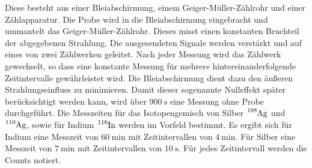 \FloatBarrier
Diese besteht aus einer Bleiabschirmung, einem Geiger-Müller-Zählrohr und einer Zählapparatur.
Die Probe wird in die Bleiabschirmung eingebracht und ummantelt das Geiger-Müller-Zählrohr.
Dieses misst einen konstanten Bruchteil der abgegebenen Strahlung.
Die ausgesendeten Signale werden verstärkt und auf eines von zwei Zählwerken geleitet.
Nach jeder Messung wird das Zählwerk gewechselt, so dass eine konstante Messung für mehrere hintereinanderfolgende Zeitintervalle gewährleistet wird.
Die Bleiabschirmung dient dazu den äußeren Strahlungseinfluss zu minimieren.
Damit dieser sogenannte Nulleffekt später berücksichtigt werden kann, wird über $\SI{900}{\second}$ eine Messung ohne Probe durchgeführt.
Die Messzeiten für das Isotopengemisch von Silber $\ce{^{108}Ag}$ und $\ce{^{110}Ag}$, sowie für Indium $\ce{^{116}In}$ werden im Vorfeld bestimmt.
Es ergibt sich für Indium eine Messzeit von $\SI{60}{\minute}$ mit Zeitintervallen von $\SI{4}{\minute}$.
Für Silber eine Messzeit von $\SI{7}{\minute}$ mit Zeitintervallen von $\SI{10}{\second}$.
Für jedes Zeitintervall werden die Counts notiert.
